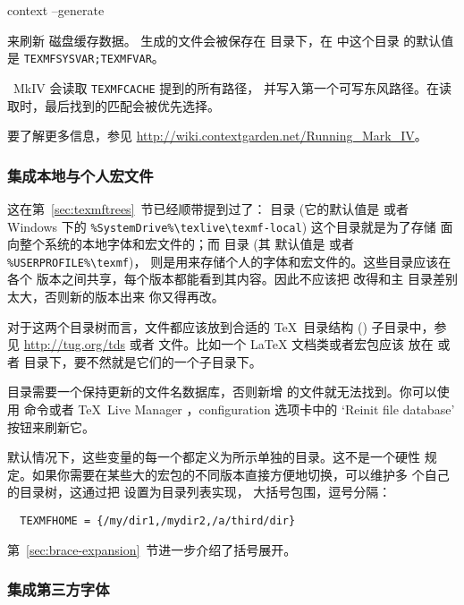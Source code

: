 \documentclass{article}
\begin{document}
\begin{sverbatim}
context --generate
\end{sverbatim}
来刷新 \ConTeXt{} 磁盘缓存数据。
生成的文件会被保存在  目录下，在 \TL{} 中这个目录
的默认值是 \verb+TEXMFSYSVAR;TEXMFVAR+。

\ConTeXt\ MkIV 会读取 \verb+TEXMFCACHE+ 提到的所有路径，
并写入第一个可写东风路径。在读取时，最后找到的匹配会被优先选择。

要了解更多信息，参见
\url{http://wiki.contextgarden.net/Running_Mark_IV}。

\subsubsection{集成本地与个人宏文件}
\label{sec:local-personal-macros}

这在第~\ref{sec:texmftrees}~节已经顺带提到过了：
目录 (它的默认值是  或者
Windows 下的 \verb|%SystemDrive%\texlive\texmf-local|) 这个目录就是为了存储
面向整个系统的本地字体和宏文件的；而  目录 (其
默认值是  或者 \verb|%USERPROFILE%\texmf|)，
则是用来存储个人的字体和宏文件的。这些目录应该在各个 \TL{}
版本之间共享，每个版本都能看到其内容。因此不应该把
 改得和主 \TL{} 目录差别太大，否则新的版本出来
你又得再改。

对于这两个目录树而言，文件都应该放到合适的 \TeX\ 目录结构 (\TDS)
子目录中，参见 \url{http://tug.org/tds} 或者
 文件。比如一个 \LaTeX{} 文档类或者宏包应该
放在  或者 
目录下，要不然就是它们的一个子目录下。

 目录需要一个保持更新的文件名数据库，否则新增
的文件就无法找到。你可以使用  命令或者
\TeX\ Live Manager \GUI{}，configuration 选项卡中的
`Reinit file database' 按钮来刷新它。

默认情况下，这些变量的每一个都定义为所示单独的目录。这不是一个硬性
规定。如果你需要在某些大的宏包的不同版本直接方便地切换，可以维护多
个自己的目录树，这通过把  设置为目录列表实现，
大括号包围，逗号分隔：

\begin{verbatim}
  TEXMFHOME = {/my/dir1,/mydir2,/a/third/dir}
\end{verbatim}

第~\ref{sec:brace-expansion}~节进一步介绍了括号展开。

\subsubsection{集成第三方字体}
\end{document}
